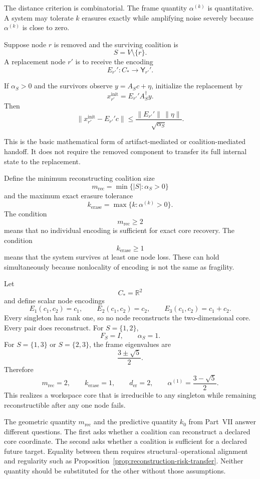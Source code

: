 The distance criterion is combinatorial. The frame quantity
\(\alpha^{(k)}\) is quantitative. A system may tolerate \(k\) erasures exactly
while amplifying noise severely because \(\alpha^{(k)}\) is close to zero.


Suppose node \(r\) is removed and the surviving coalition is
\[
S=V\setminus\{r\}.
\]
A replacement node \(r'\) is to receive the encoding
\[
E_{r'}':C_*\to\mathsf Y_{r'}'.
\]

\begin{corollary}\label{cor:handoff-initialization}
If \(\alpha_S>0\) and the survivors observe \(y=A_Sc+\eta\), initialize the
replacement by
\[
x_{r'}^{\mathrm{init}}
=E_{r'}'A_S^\dagger y.
\]
Then
\[
\boxed{
\|x_{r'}^{\mathrm{init}}-E_{r'}'c\|
\leq
\frac{\|E_{r'}'\|\,\|\eta\|}{\sqrt{\alpha_S}}.
}
\]
\end{corollary}

This is the basic mathematical form of artifact-mediated or
coalition-mediated handoff. It does not require the removed component to
transfer its full internal state to the replacement.


Define the minimum reconstructing coalition size
\[
\boxed{
m_{\mathrm{rec}}
=
\min\{|S|:\alpha_S>0\}
}
\]
and the maximum exact erasure tolerance
\[
\boxed{
k_{\mathrm{erase}}
=
\max\{k:\alpha^{(k)}>0\}.
}
\]
The condition
\[
m_{\mathrm{rec}}\geq2
\]
means that no individual encoding is sufficient for exact core recovery. The
condition
\[
k_{\mathrm{erase}}\geq1
\]
means that the system survives at least one node loss. These can hold
simultaneously because nonlocality of encoding is not the same as fragility.


Let
\[
C_*=\mathbb R^2
\]
and define scalar node encodings
\[
E_1(c_1,c_2)=c_1,
\qquad
E_2(c_1,c_2)=c_2,
\qquad
E_3(c_1,c_2)=c_1+c_2.
\]
Every singleton has rank one, so no node reconstructs the two-dimensional
core. Every pair does reconstruct. For \(S=\{1,2\}\),
\[
F_S=I,
\qquad
\alpha_S=1.
\]
For \(S=\{1,3\}\) or \(S=\{2,3\}\), the frame eigenvalues are
\[
\frac{3\pm\sqrt5}{2}.
\]
Therefore
\[
\boxed{
m_{\mathrm{rec}}=2,
\qquad
k_{\mathrm{erase}}=1,
\qquad
d_{\mathrm{er}}=2,
\qquad
\alpha^{(1)}=\frac{3-\sqrt5}{2}.
}
\]
This realizes a workspace core that is irreducible to any singleton while
remaining reconstructible after any one node fails.


The geometric quantity \(m_{\mathrm{rec}}\) and the predictive quantity
\(k_0\) from Part~VII answer different questions. The first asks whether a
coalition can reconstruct a declared core coordinate. The second asks whether
a coalition is sufficient for a declared future target. Equality between them
requires structural--operational alignment and regularity such as
Proposition~\ref{prop:reconstruction-risk-transfer}. Neither quantity should
be substituted for the other without those assumptions.
